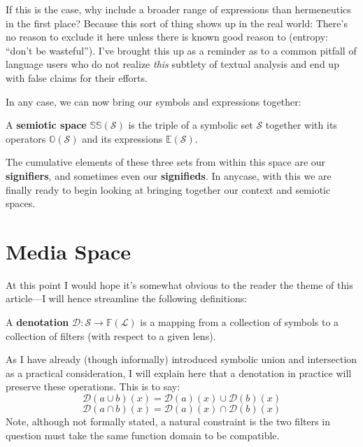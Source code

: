 \documentclass[twoside]{article}
\newenvironment{definition}[1][Definition]{\begin{trivlist}
\item[\hskip \labelsep {\bfseries #1:}]}{\end{trivlist}}
\begin{document}
If this is the case, why include a broader range of expressions than hermeneutics in the first place? Because this sort
of thing shows up in the real world: There's no reason to exclude it here unless there is known good reason to
(entropy: ``don't be wasteful''). I've brought this up as a reminder as to a common pitfall of language users who do
not realize \emph{this} subtlety of textual analysis and end up with false claims for their efforts.

In any case, we can now bring our symbols and expressions together:

\begin{definition}[Semiotic Space]

A {\bfseries semiotic space} $ \mathbb{SS}(\mathcal{S}) $ is the triple of a symbolic set $ \mathcal{S} $
together with its operators $ \mathbb{O}(\mathcal{S}) $ and its expressions $ \mathbb{E}(\mathcal{S}) $.

\end{definition}

The cumulative elements of these three sets from within this space are our {\bfseries signifiers},
and sometimes even our {\bfseries signifieds}.  In anycase, with this we are finally ready to begin
looking at bringing together our context and semiotic spaces.

\section*{Media Space}

At this point I would hope it's somewhat obvious to the reader the theme of this article---I will hence
streamline the following definitions:

\begin{definition}[Media Space - Context]

A {\bfseries denotation} $ \mathcal{D}:\mathcal{S}\to\mathbb{F}(\mathcal{L}) $ is a mapping from a collection
of symbols to a collection of filters (with respect to a given lens).

\end{definition}

As I have already (though informally) introduced symbolic union and intersection as a practical consideration,
I will explain here that a denotation in practice will preserve these operations. This is to say:
$$ \mathcal{D}(a\cup b)(x)=\mathcal{D}(a)(x)\cup\mathcal{D}(b)(x) $$
$$ \mathcal{D}(a\cap b)(x)=\mathcal{D}(a)(x)\cap\mathcal{D}(b)(x) $$
Note, although not formally stated, a natural constraint is the two filters in question must take the same function
domain to be compatible.
\end{document}
